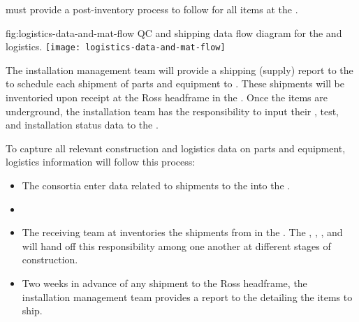  must provide a post-inventory  %
process to follow for all %
items at the . 

\begin{dunefigure}{fig:logistics-data-and-mat-flow}
  {QC and shipping data flow diagram for the  and  logistics.}
 \texttt{[image: logistics-data-and-mat-flow]}
\end{dunefigure}

The  installation management team will provide %
a shipping (supply) report to the  %
to schedule each shipment of parts and equipment to . 
These shipments %
will be inventoried upon receipt %
at the Ross headframe %
in the . 
Once the items are underground, the  installation team has the responsibility to  %
input their %
, %
test, and installation status data to the . %

 To capture all relevant construction and logistics data on parts and equipment, logistics information will %
follow this process:

\begin{itemize}
\item The consortia enter data related to %
shipments to the  into the . 
\item {}
\item The receiving team at  inventories the shipments from  %
in the . The , , , and  will hand off this responsibility among one another at different stages of construction. 
\item Two weeks in advance of any shipment to the Ross headframe, the  installation management team %
provides a %
report to the  detailing the items to ship. %
\end{itemize}

